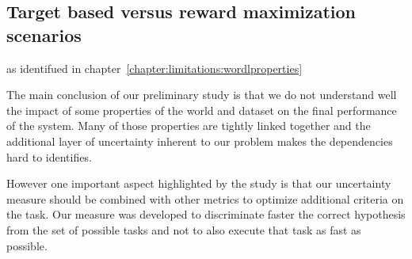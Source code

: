 \subsection{Target based versus reward maximization scenarios}


as identifued in chapter~\ref{chapter:limitations:wordlproperties}

The main conclusion of our preliminary study is that we do not understand well the impact of some properties of the world and dataset on the final performance of the system. Many of those properties are tightly linked together and the additional layer of uncertainty inherent to our problem makes the dependencies hard to identifies.

However one important aspect highlighted by the study is that our uncertainty measure should be combined with other metrics to optimize additional criteria on the task. Our measure was developed to discriminate faster the correct hypothesis from the set of possible tasks and not to also execute that task as fast as possible.

